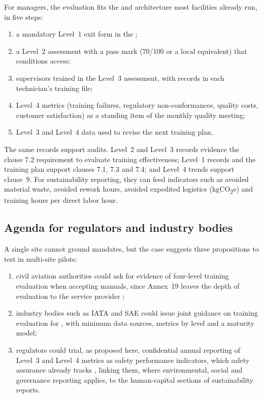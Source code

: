For \MRO{} managers, the evaluation fits the \LMS{} and \ERP{} architecture most facilities already run, in five steps:

\begin{enumerate}[label=(\arabic*)]
  \item a mandatory Level~1 exit form in the \LMS{};
  \item a Level~2 assessment with a pass mark (70/100 or a local equivalent) that conditions \ERP{} access;
  \item supervisors trained in the Level~3 assessment, with records in each technician's training file;
  \item Level~4 metrics (training failures, regulatory non-conformances, quality costs, customer satisfaction) as a standing item of the monthly quality meeting;
  \item Level~3 and Level~4 data used to revise the next training plan.
\end{enumerate}

The same records support audits. Level~2 and Level~3 records evidence the clause 7.2 requirement to evaluate training effectiveness; Level~1 records and the training plan support clauses 7.1, 7.3 and 7.4; and Level~4 trends support clause~9. For sustainability reporting, they can feed indicators such as avoided material waste, avoided rework hours, avoided expedited logistics (kgCO\textsubscript{2}e) and training hours per direct labor hour.

\subsection{Agenda for regulators and industry bodies}
\label{subsec:policy}

A single site cannot ground mandates, but the case suggests three propositions to test in multi-site pilots:

\begin{enumerate}[label=(\arabic*)]
  \item civil aviation authorities could ask for evidence of four-level training evaluation when accepting \SMS{} manuals, since \ICAO{} Annex~19 leaves the depth of evaluation to the service provider \parencite{Nakamura2024,OConnor2024};
  \item industry bodies such as IATA and SAE could issue joint guidance on training evaluation for \MRO{}, with minimum data sources, metrics by level and a maturity model;
  \item regulators could trial, as proposed here, confidential annual reporting of Level~3 and Level~4 metrics as safety performance indicators, which \SMS{} safety assurance already tracks \parencite{FAA2024}, linking them, where environmental, social and governance reporting applies, to the human-capital sections of sustainability reports.
\end{enumerate}
